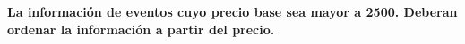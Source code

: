 \textbf{La información de eventos cuyo precio base sea mayor a 2500. Deberan ordenar la información a partir
del precio.}\vspace{.3cm}